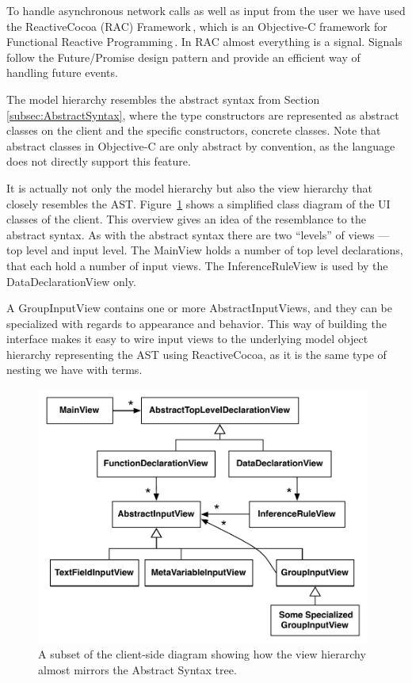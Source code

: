 To handle asynchronous network calls as well as input from the user we have
used the ReactiveCocoa (RAC) Framework\,\cite{reactiveCocoa}, which is an Objective-C framework for
Functional Reactive Programming\,\cite{Furrow:FunctionalReactiveProgramming}. In RAC almost everything is a
signal. Signals follow the Future/Promise design pattern and provide an
efficient way of handling future events.

The model hierarchy resembles the abstract syntax from Section \ref{subsec:AbstractSyntax},
where the type constructors are represented as abstract classes on the client
and the specific constructors, concrete classes. Note that abstract classes in
Objective-C are only abstract by convention, as the language does not directly
support this feature.

It is actually not only the model hierarchy but also the view hierarchy that closely resembles the AST. Figure~\ref{fig:clientViewArchitecture} shows a simplified class diagram of the UI classes of the client. This overview gives an idea of
the resemblance to the abstract syntax. As with the abstract syntax there are
two ``levels'' of views --- top level and input level. The MainView holds a
number of top level declarations, that each hold a number of input views. The
InferenceRuleView is used by the DataDeclarationView only.

A GroupInputView contains one or more AbstractInputViews, and they can be specialized with regards to appearance and behavior. This way of building
the interface makes it easy to wire input views to the underlying model object
hierarchy representing the AST using ReactiveCocoa, as it is the same type of nesting we have with terms. 

\begin{figure}
	\centering
		\includegraphics[width=110mm]{diagrams/client_side_class_diagram.pdf}
	\caption{A subset of the client-side diagram showing how the view hierarchy
	almost mirrors the Abstract Syntax tree.}
\label{fig:clientViewArchitecture}
\end{figure}











